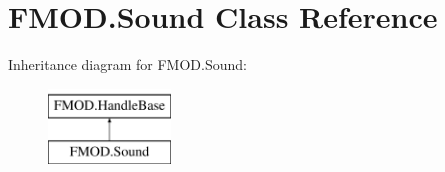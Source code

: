 \hypertarget{class_f_m_o_d_1_1_sound}{}\section{F\+M\+O\+D.\+Sound Class Reference}
\label{class_f_m_o_d_1_1_sound}
Inheritance diagram for F\+M\+O\+D.\+Sound\+:\begin{figure}[H]
\begin{center}
\leavevmode
\includegraphics[height=2.000000cm]{class_f_m_o_d_1_1_sound}
\end{center}
\end{figure}
